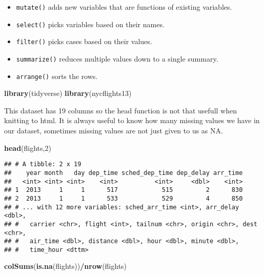 \documentclass[]{article}
\newenvironment{Shaded}{\begin{snugshade}}{\end{snugshade}}
\newcommand{\DecValTok}[1]{\textcolor[rgb]{0.00,0.00,0.81}{#1}}
\newcommand{\KeywordTok}[1]{\textcolor[rgb]{0.13,0.29,0.53}{\textbf{#1}}}
\newcommand{\NormalTok}[1]{#1}
\newcommand{\OperatorTok}[1]{\textcolor[rgb]{0.81,0.36,0.00}{\textbf{#1}}}
\providecommand{\tightlist}{%
  \setlength{\itemsep}{0pt}\setlength{\parskip}{0pt}}
\begin{document}
\begin{itemize}
\tightlist
\item
  \texttt{mutate()} adds new variables that are functions of existing
  variables.
\item
  \texttt{select()} picks variables based on their names.
\item
  \texttt{filter()} picks cases based on their values.
\item
  \texttt{summarize()} reduces multiple values down to a single summary.
\item
  \texttt{arrange()} sorts the rows.
\end{itemize}

\begin{Shaded}
\begin{Highlighting}[]
\KeywordTok{library}\NormalTok{(tidyverse)}
\KeywordTok{library}\NormalTok{(nycflights13)}
\end{Highlighting}
\end{Shaded}

This dataset has 19 columns so the head function is not that usefull
when knitting to html. It is always useful to know how many missing
values we have in our dataset, sometimes missing values are not just
given to us as NA.

\begin{Shaded}
\begin{Highlighting}[]
\KeywordTok{head}\NormalTok{(flights,}\DecValTok{2}\NormalTok{)}
\end{Highlighting}
\end{Shaded}

\begin{verbatim}
## # A tibble: 2 x 19
##    year month   day dep_time sched_dep_time dep_delay arr_time
##   <int> <int> <int>    <int>          <int>     <dbl>    <int>
## 1  2013     1     1      517            515         2      830
## 2  2013     1     1      533            529         4      850
## # ... with 12 more variables: sched_arr_time <int>, arr_delay <dbl>,
## #   carrier <chr>, flight <int>, tailnum <chr>, origin <chr>, dest <chr>,
## #   air_time <dbl>, distance <dbl>, hour <dbl>, minute <dbl>,
## #   time_hour <dttm>
\end{verbatim}

\begin{Shaded}
\begin{Highlighting}[]
\KeywordTok{colSums}\NormalTok{(}\KeywordTok{is.na}\NormalTok{(flights))}\OperatorTok{/}\KeywordTok{nrow}\NormalTok{(flights) }
\end{Highlighting}
\end{Shaded}
\end{document}
